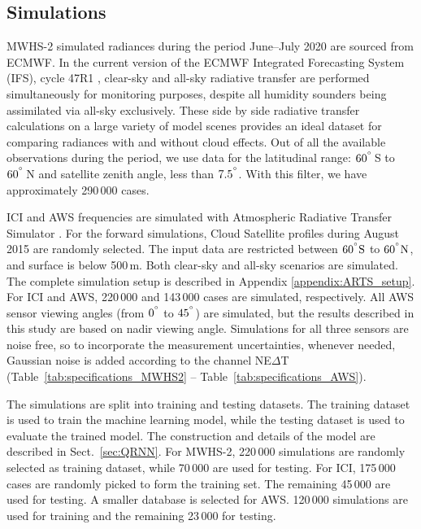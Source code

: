 \documentclass[amt, manuscript]{copernicus}
\begin{document}
\subsection{Simulations}
%
MWHS-2 simulated radiances during the period June--July 2020 are sourced from ECMWF. In the current version of the ECMWF Integrated Forecasting System (IFS), cycle 47R1 \citep{IFS47R1chap1}, clear-sky and all-sky radiative transfer are performed simultaneously for monitoring purposes, despite all humidity sounders being assimilated via all-sky exclusively. These side by side radiative transfer calculations on a large variety of model scenes provides an ideal dataset for comparing radiances with and without cloud effects. Out of all the available observations during the period, we use data for the latitudinal range: $60^{^{\circ}}$\,S to $60^{^{\circ}}$\,N and satellite zenith angle, less than $7.5^{^{\circ}}$. With this filter, we have approximately 290\,000 cases.

ICI and AWS frequencies are simulated with Atmospheric Radiative Transfer Simulator \citep[ARTS,][]{buehler:artst:18}. For the forward simulations, Cloud Satellite \citep[Cloudsat,][]{Stephens2002cloudsat} profiles during August 2015 are randomly selected. The input data are restricted between $60\unit{^{\degree}S}$ to $60\unit{^{\degree}N}$, and surface is below 500\,m. Both clear-sky and all-sky scenarios  are simulated. The complete simulation setup is described in Appendix \ref{appendix:ARTS_setup}. For ICI and AWS, 220\,000 and 143\,000 cases are simulated, respectively. All AWS sensor viewing angles (from $0^{^{\circ}}$ to $45^{^{\circ}}$) are simulated, but the results described in this study are based on nadir viewing angle. Simulations for all three sensors are noise free, so to incorporate the measurement uncertainties, whenever needed, Gaussian noise is added according to the channel NE$\Delta$T (Table~\ref{tab:specifications_MWHS2} -- Table~\ref{tab:specifications_AWS}). 

The simulations are split into training and testing datasets. The training dataset is used to train the machine learning model, while the testing dataset is used to evaluate the trained model. The construction and details of the model are described in Sect.~\ref{sec:QRNN}. For MWHS-2, 220\,000 simulations are randomly selected as training dataset, while 70\,000 are used for testing. For ICI, 175\,000 cases are randomly picked to form the training set. The remaining 45\,000 are used for testing. A smaller database is selected for AWS. 120\,000 simulations are used for training and the remaining 23\,000 for testing.
\end{document}
